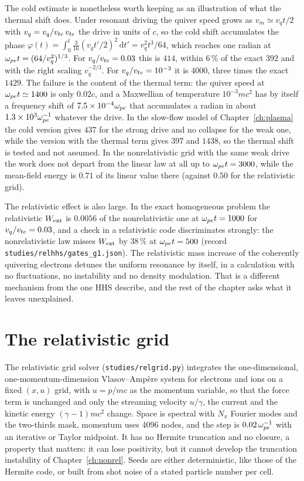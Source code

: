 The cold estimate is nonetheless worth keeping as an illustration of what the thermal shift does. Under resonant driving the quiver speed grows as $v_m\simeq v_q t/2$ with $v_q=v_q/v_{te}\,v_{te}$ the drive in units of $c$, so the cold shift accumulates the phase $\varphi(t)=\int_0^t\tfrac3{16}(v_qt'/2)^2\,\mathrm dt'=v_q^2t^3/64$, which reaches one radian at $\omega_{pe} t=(64/v_q^2)^{1/3}$. For $v_q/v_{te}=0.03$ this is $414$, within $6\,\%$ of the exact $392$ and with the right scaling $v_q^{-2/3}$. For $v_q/v_{te}=10^{-3}$ it is $4000$, three times the exact $1429$. The failure is the content of the thermal term: the quiver speed at $\omega_{pe} t\simeq1400$ is only $0.02c$, and a Maxwellian of temperature $10^{-3}mc^2$ has by itself a frequency shift of $7.5\times10^{-4}\omega_{pe}$ that accumulates a radian in about $1.3\times10^3\omega_{pe}^{-1}$ whatever the drive. In the slow-flow model of Chapter~\ref{ch:plasma} the cold version gives $437$ for the strong drive and no collapse for the weak one, while the version with the thermal term gives $397$ and $1438$, so the thermal shift is tested and not assumed. In the nonrelativistic grid with the same weak drive the work does not depart from the linear law at all up to $\omega_{pe} t=3000$, while the mean-field energy is $0.71$ of its linear value there (against $0.50$ for the relativistic grid).

The relativistic effect is also large. In the exact homogeneous problem the relativistic $W_{\rm ext}$ is $0.0056$ of the nonrelativistic one at $\omega_{pe} t=1000$ for $v_q/v_{te}=0.03$, and a check in a relativistic code discriminates strongly: the nonrelativistic law misses $W_{\rm ext}$ by $38\,\%$ at $\omega_{pe} t=500$ (record \texttt{studies/relhhs/gates\_g1.json}). The relativistic mass increase of the coherently quivering electrons detunes the uniform resonance by itself, in a calculation with no fluctuations, no instability and no density modulation. That is a different mechanism from the one HHS describe, and the rest of the chapter asks what it leaves unexplained.

\section{The relativistic grid}\label{sec:c10-grid}


The relativistic grid solver (\texttt{studies/relgrid.py}) integrates the one-dimensional, one-momentum-dimension Vlasov--Amp\`ere system for electrons and ions on a fixed $(x,u)$ grid, with $u=p/mc$ as the momentum variable, so that the force term is unchanged and only the streaming velocity $u/\gamma$, the current and the kinetic energy $(\gamma-1)mc^2$ change. Space is spectral with $N_x$ Fourier modes and the two-thirds mask, momentum uses 4096 nodes, and the step is $0.02\,\omega_{pe}^{-1}$ with an iterative or Taylor midpoint. It has no Hermite truncation and no closure, a property that matters: it can lose positivity, but it cannot develop the truncation instability of Chapter~\ref{ch:nonrel}. Seeds are either deterministic, like those of the Hermite code, or built from shot noise of a stated particle number per cell.

